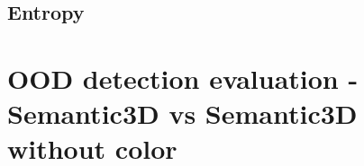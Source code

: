     \subsection{Entropy}

    \section{OOD detection evaluation -  Semantic3D vs Semantic3D without color}

